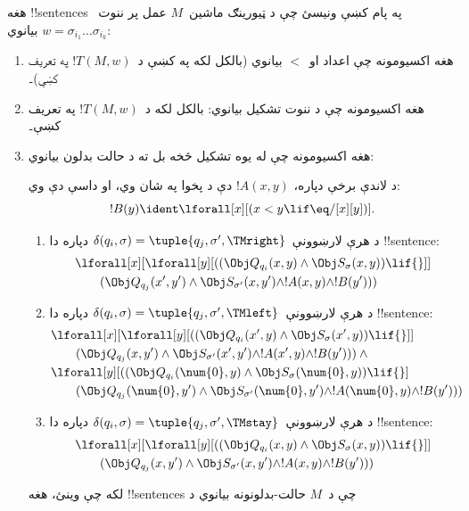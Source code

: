 \documentclass[../../../include/open-logic-section]{subfiles}
\begin{document}
هغه !!{sentence}s په پام کښې ونيسئ چې د ټيورينګ ماشين~$M$ عمل پر
ننوت~$w = \sigma_{i_1}\dots\sigma_{i_k}$ بيانوي:
\begin{enumerate}
\item هغه اکسيومونه چې اعداد او~$<$ بيانوي (بالکل لکه په
 کښې د~$!T(M,w)$ په تعريف کښې)۔
\item هغه اکسيومونه چې د ننوت تشکيل بيانوي: بالکل لکه د~$!T(M,w)$
په تعريف کښې۔
\item هغه اکسيومونه چې له يوه تشکيل څخه بل ته د حالت بدلون بيانوي:

د لاندې برخې دپاره، $!A(x, y)$ دې د پخوا په شان وي، او داسې دې وي:
\[
  !B(y) \ident \lforall[x][(x < y \lif \eq/[x][y])].
\]
\begin{enumerate}
\item {} د هرې لارښوونې~$\delta(q_i, \sigma) =
  \tuple{q_j, \sigma', \TMright}$ دپاره دا !!{sentence}:
\begin{align*}
& \lforall[x][\lforall[y][(
   (\Obj Q_{q_i}(x, y) \land \Obj S_{\sigma}(x, y)) \lif {}]] \\
&\qquad   (\Obj Q_{q_j}(x', y') \land \Obj S_{\sigma'}(x, y') \land
!A(x, y) \land !B(y')))
\end{align*}
\item {} د هرې لارښوونې~$\delta(q_i, \sigma) =
  \tuple{q_j, \sigma', \TMleft}$ دپاره دا !!{sentence}:
\begin{align*}
& \lforall[x][\lforall[y][
    ((\Obj Q_{q_i}(x', y) \land \Obj S_{\sigma}(x', y)) \lif {}]]\\
& \qquad   (\Obj Q_{q_j}(x, y') \land \Obj S_{\sigma'}(x', y') \land
!A(x', y) \land !B(y'))) \land {}\\
& \lforall[y][((\Obj Q_{q_i}(\num{0}, y) \land \Obj S_{\sigma}(\num{0},
    y)) \lif {}]\\
& \qquad (\Obj Q_{q_j}(\num{0}, y') \land \Obj S_{\sigma'}(\num{0},
  y') \land !A(\num{0}, y) \land !B(y')))
\end{align*}
\item {} د هرې لارښوونې~$\delta(q_i, \sigma) =
  \tuple{q_j, \sigma', \TMstay}$ دپاره دا !!{sentence}:
\begin{align*}
& \lforall[x][\lforall[y][(
   (\Obj Q_{q_i}(x, y) \land \Obj S_{\sigma}(x, y)) \lif {}]] \\
&\qquad (\Obj Q_{q_j}(x, y') \land \Obj S_{\sigma'}(x, y') \land
!A(x, y) \land !B(y')))
\end{align*}
\end{enumerate}
لکه چې وينئ، هغه !!{sentence}s چې د~$M$ حالت-بدلونونه بيانوي د

\end{enumerate}
\end{document}
